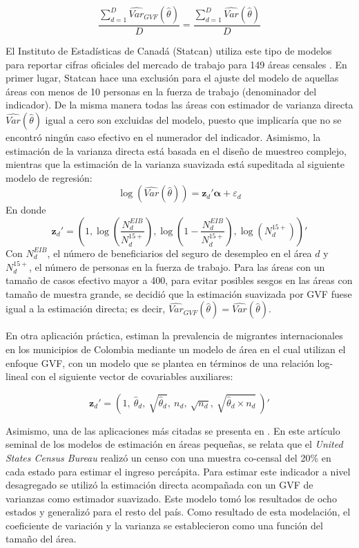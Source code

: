 \documentclass[
  12pt,
]{book}
\begin{document}
\[
\frac{\sum_{d=1}^D \widehat{Var}_{GVF}(\hat{\theta}) }{D} = \frac{\sum_{d=1}^D \widehat{{Var}}(\hat{\theta})}{D}
\]

El Instituto de Estadísticas de Canadá (Statcan) utiliza este tipo de modelos para reportar cifras oficiales del mercado de trabajo para 149 áreas censales \citep{statcan2016}. En primer lugar, Statcan hace una exclusión para el ajuste del modelo de aquellas áreas con menos de 10 personas en la fuerza de trabajo (denominador del indicador). De la misma manera todas las áreas con estimador de varianza directa \(\widehat{{Var}}(\hat{\theta})\) igual a cero son excluidas del modelo, puesto que implicaría que no se encontró ningún caso efectivo en el numerador del indicador. Asimismo, la estimación de la varianza directa está basada en el diseño de muestreo complejo, mientras que la estimación de la varianza suavizada está supeditada al siguiente modelo de regresión:
\[
\log(\widehat{Var}(\hat{\theta})) = \mathbf z_d' \boldsymbol \alpha + \varepsilon_d
\]
En donde
\[
\mathbf z_d'=\left(1, \log\left(\frac{N_d^{EIB}}{N_d^{15+}}\right),
\log\left(1-\frac{N_d^{EIB}}{N_d^{15+}}\right),
\log\left(N_d^{15+}\right)\right)'
\]
Con \(N_d^{EIB}\), el número de beneficiarios del seguro de desempleo en el área \(d\) y \(N_d^{15+}\), el número de personas en la fuerza de trabajo. Para las áreas con un tamaño de casos efectivo mayor a 400, para evitar posibles sesgos en las áreas con tamaño de muestra grande, se decidió que la estimación suavizada por GVF fuese igual a la estimación directa; es decir, \(\widehat{Var}_{GVF}(\hat{\theta}) = \widehat{Var}(\hat{\theta})\).

En otra aplicación práctica, \citet{Fuquene_Cristancho_Ospina_Morales_2019} estiman la prevalencia de migrantes internacionales en los municipios de Colombia mediante un modelo de área en el cual utilizan el enfoque GVF, con un modelo que se plantea en términos de una relación log-lineal con el siguiente vector de covariables auxiliares:

\[
\mathbf z_d'=\left(1, \
\hat\theta_d, \
\sqrt{\hat\theta_d}, \
n_d, \
\sqrt{n_d}, \
\sqrt{\hat\theta_d \times n_d} \
\right)'
\]

Asimismo, una de las aplicaciones más citadas se presenta en \citet{III_Herriot_1979}. En este artículo seminal de los modelos de estimación en áreas pequeñas, se relata que el \emph{United States Census Bureau} realizó un censo con una muestra co-censal del 20\% en cada estado para estimar el ingreso percápita. Para estimar este indicador a nivel desagregado se utilizó la estimación directa acompañada con un GVF de varianzas como estimador suavizado. Este modelo tomó los resultados de ocho estados y generalizó para el resto del país. Como resultado de esta modelación, el coeficiente de variación y la varianza se establecieron como una función del tamaño del área.
\end{document}

